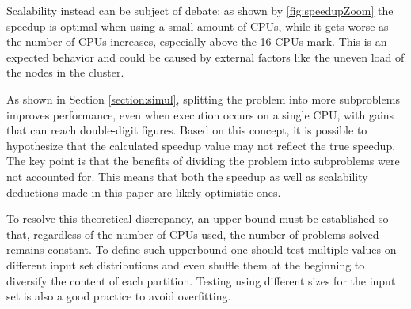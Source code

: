 \documentclass[a4paper]{article}
\begin{document}
Scalability instead can be subject of debate: as shown by \figurename{ \ref{fig:speedupZoom}} the speedup is optimal when using a small amount of CPUs, while it gets worse as the number of CPUs increases, especially above the 16 CPUs mark.
This is an expected behavior and could be caused by external factors like the uneven load of the nodes in the cluster.

As shown in Section \ref{section:simul}, splitting the problem into more subproblems improves performance, even when execution occurs on a single CPU, with gains that can reach double-digit figures.
Based on this concept, it is possible to hypothesize that the calculated speedup value may not reflect the true speedup.
The key point is that the benefits of dividing the problem into subproblems were not accounted for.
This means that both the speedup as well as scalability deductions made in this paper are likely optimistic ones.

To resolve this theoretical discrepancy, an upper bound must be established so that, regardless of the number of CPUs used, the number of problems solved remains constant.
To define such upperbound one should test multiple values on different input set distributions and even shuffle them at the beginning to diversify the content of each partition.
Testing using different sizes for the input set is also a good practice to avoid overfitting.


\end{document}
